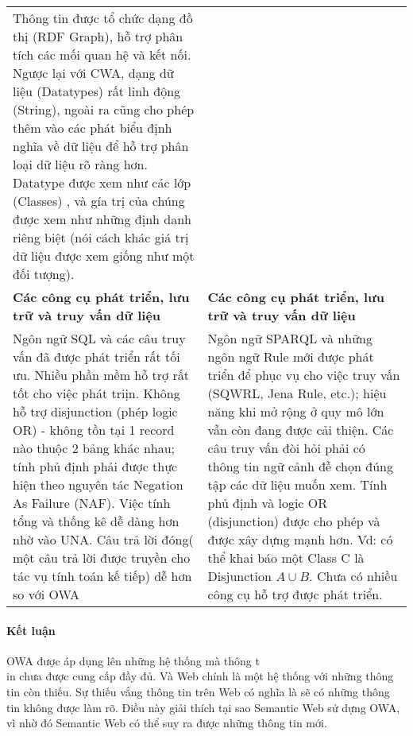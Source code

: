 \begin{longtable}{ p{7cm} p{7cm} }
Thông tin được tổ chức dạng đồ thị (RDF Graph), hỗ trợ phân tích các mối quan hệ và kết nối. Ngược lại với CWA, dạng dữ liệu (Datatypes) rất linh động (String), ngoài ra cũng cho phép thêm vào các phát biểu định nghĩa về dữ liệu để hỗ trợ phân loại dữ liệu rõ ràng hơn. Datatype được xem như các lớp (Classes) , và gía trị của chúng được xem như những định danh riêng biệt (nói cách khác giá trị dữ liệu được xem giống như một đối tượng).
\\
\textbf{Các công cụ phát triển, lưu trữ và truy vấn dữ liệu}
&
\textbf{Các công cụ phát triển, lưu trữ và truy vấn dữ liệu}
\\
Ngôn ngữ SQL và các câu truy vấn đã được phát triển rất tối ưu. Nhiều phần mềm hỗ trợ rất tốt cho việc phát triịn. Không hỗ trợ disjunction (phép logic OR) - không tồn tại 1 record nào thuộc 2 bảng khác nhau; tính phủ định phải được thực hiện theo nguyên tác Negation As Failure (NAF). Việc tính tổng và thống kê dễ dàng hơn nhờ vào UNA. Câu trả lời đóng( một câu trả lời được truyền cho tác vụ tính toán kế tiếp) dễ hơn so với OWA
&
Ngôn ngữ SPARQL và những ngôn ngữ Rule mới được phát triển để phục vụ cho việc truy vấn (SQWRL, Jena Rule, etc.); hiệu năng khi mở rộng ở quy mô lớn vẫn còn đang được cải thiện.
Các câu truy vấn đòi hỏi phải có thông tin ngữ cảnh đễ chọn đúng tập các dữ liệu muốn xem.
Tính phủ định và logic OR (disjunction) được cho phép và được xây dựng mạnh hơn. Vd: có thể khai báo một Class C là Disjunction $A \cup B$. Chưa có nhiều công cụ hỗ trợ được phát triển.
\\ 
\end{longtable}
{\let\thefootnote\relax{}
	\let\thefootnote\relax{}
}
\paragraph{Kết luận} OWA được áp dụng lên những hệ thống mà thông t
\\in chưa được cung cấp đầy đủ. Và Web chính là một hệ thống với những thông tin còn thiếu. Sự thiếu vắng thông tin trên Web có nghĩa là sẽ có những thông tin không được làm rõ. Điều này giải thích tại sao Semantic Web sử dựng OWA, vì nhờ đó Semantic Web có thể suy ra được những thông tin mới.
